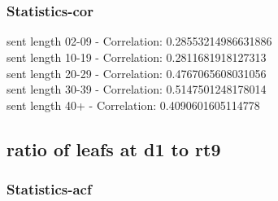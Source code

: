 \documentclass{article}%
\begin{document}
\begin{figure}[ht]%
\centering%
\setlength{\abovecaptionskip}{-35pt}%
%
%
\\%
%
%
\\%
%
\end{figure}

%
\newpage%
\subsubsection{Statistics{-}cor}%
\label{ssubsec:Statistics{-}cor}%
\noindent%
sent length 02-09 - Correlation: 0.28553214986631886\\%
sent length 10-19 - Correlation: 0.2811681918127313\\%
sent length 20-29 - Correlation: 0.4767065608031056\\%
sent length 30-39 - Correlation: 0.5147501248178014\\%
sent length 40+ - Correlation: 0.4090601605114778\\

%
\newpage

%
\subsection{ratio of leafs at d1 to rt9}%
\label{subsec:ratioofleafsatd1tort9}%
\subsubsection{Statistics{-}acf}%
\label{ssubsec:Statistics{-}acf}%
\end{document}
